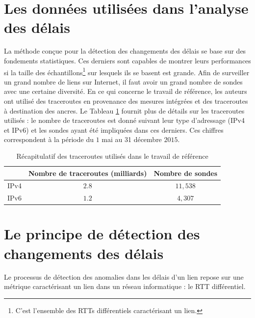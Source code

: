 \section{Les données utilisées dans l'analyse des délais}
La méthode conçue pour la détection des changements des délais se base sur des fondements statistiques. Ces derniers sont capables de montrer leurs performances si la taille des échantillons\footnote{C'est l'ensemble des RTTs différentiels caractérisant un lien.} sur lesquels ils se basent est grande.   Afin de surveiller un grand nombre de liens sur Internet, il faut avoir un grand nombre de sondes avec une certaine diversité.  En ce qui concerne le travail de référence, les auteurs ont utilisé des traceroutes en provenance des mesures intégrées et des traceroutes à destination des ancres.
Le Tableau \ref{tab:dataset} fournit plus de détails sur les traceroutes utilisés : le nombre de traceroutes est donné suivant leur type d'adressage (IPv4 et IPv6) et les sondes ayant été impliquées dans ces derniers.
Ces chiffres correspondent à la période du $1$ mai au 31 décembre $2015$.
\begin{table}[H]
	\centering
	\begin{tabular}{c c c}
		\hline
		& \textbf{Nombre de traceroutes (milliards)}& \textbf{Nombre de sondes}\\ \hline
		IPv4		&$ 2.8 $  & $ 11,538 $\\ \hline
		IPv6	&	$ 1.2 $  & $ 4,307 $ \\ \hline
	\end{tabular}
	\caption{Récapitulatif des traceroutes utilisés dans le travail de référence }
	\label{tab:dataset}
\end{table}

\section{Le principe de détection des changements des délais} \label{principe-de-detection}

Le processus de  détection des anomalies dans les délais d'un lien repose sur une métrique caractérisant un lien dans un réseau informatique : le RTT différentiel.

